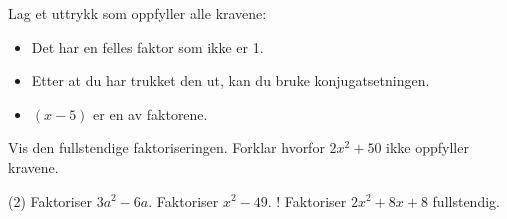 Lag et uttrykk som oppfyller alle kravene:
\begin{itemize}[leftmargin=1.2em,itemsep=0pt,topsep=2pt]
  \item Det har en felles faktor som ikke er 1.
  \item Etter at du har trukket den ut, kan du bruke konjugatsetningen.
  \item $(x-5)$ er en av faktorene.
\end{itemize}
Vis den fullstendige faktoriseringen. Forklar hvorfor $2x^2 + 50$ ikke oppfyller kravene.

\begin{sjekk}
\begin{tasks}(2)
  \task Faktoriser $3a^2 - 6a$.
  \task Faktoriser $x^2 - 49$.
  \task! Faktoriser $2x^2 + 8x + 8$ fullstendig.
\end{tasks}
\end{sjekk}
